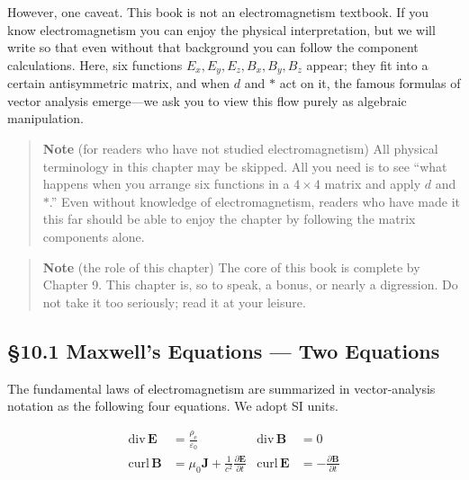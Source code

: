 \documentclass[a4paper,12pt,openany]{book}
\begin{document}
However, one caveat. This book is not an electromagnetism textbook. If
you know electromagnetism you can enjoy the physical interpretation, but
we will write so that even without that background you can follow the
component calculations. Here, six functions
\(E_x, E_y, E_z, B_x, B_y, B_z\) appear; they fit into a certain
antisymmetric matrix, and when \(d\) and \(\ast\) act on it, the famous
formulas of vector analysis emerge—we ask you to view this flow purely
as algebraic manipulation.

\begin{quote}
\textbf{Note} (for readers who have not studied electromagnetism) All
physical terminology in this chapter may be skipped. All you need is to
see ``what happens when you arrange six functions in a \(4\times4\)
matrix and apply \(d\) and \(\ast\).'' Even without knowledge of
electromagnetism, readers who have made it this far should be able to
enjoy the chapter by following the matrix components alone.
\end{quote}

\begin{quote}
\textbf{Note} (the role of this chapter) The core of this book is
complete by Chapter 9. This chapter is, so to speak, a bonus, or nearly
a digression. Do not take it too seriously; read it at your leisure.
\end{quote}

\par\vspace{0.35em}\par

\hypertarget{maxwells-equations-two-equations}{%
\subsection{§10.1 Maxwell's Equations — Two
Equations}\label{maxwells-equations-two-equations}}

The fundamental laws of electromagnetism are summarized in
vector-analysis notation as the following four equations. We adopt SI
units.

\[\begin{aligned}
\mathrm{div}\,\mathbf{E} &= \frac{\rho_{\mathrm e}}{\varepsilon_0} &
\mathrm{div}\,\mathbf{B} &= 0 \\[0.5em]
\mathrm{curl}\,\mathbf{B} &= \mu_0\mathbf{J} + \frac{1}{c^2}\frac{\partial \mathbf{E}}{\partial t} &
\mathrm{curl}\,\mathbf{E} &= -\frac{\partial \mathbf{B}}{\partial t}
\end{aligned}\]
\end{document}
